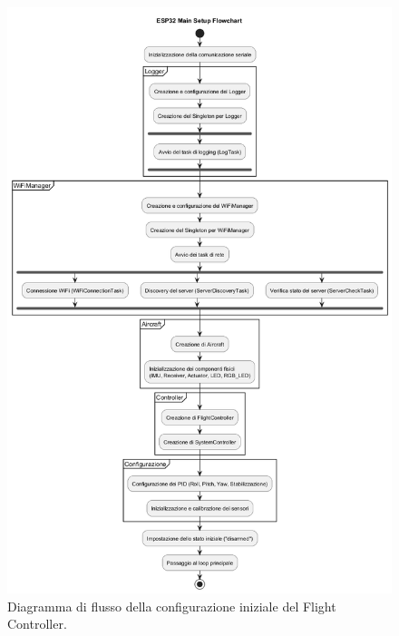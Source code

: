\begin{figure}[h!]
    \centering
    \includegraphics[width=\textwidth]{diagrams/esp32_setup_flowchart.png}
    \caption{Diagramma di flusso della configurazione iniziale del Flight Controller.}
    \label{fig:esp32_setup_flowchart}
\end{figure}

